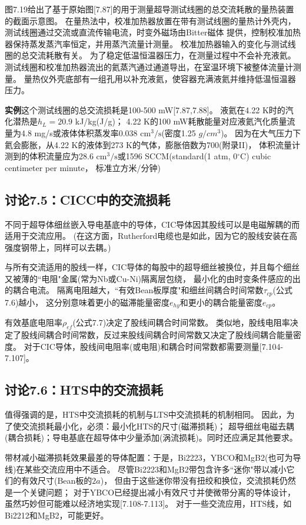 图7.19给出了基于原始图[7.87]的用于测量超导测试线圈的总交流耗散的量热装置的截面示意图。
在量热法中，校准加热器放置在带有测试线圈的量热计外壳内，测试线圈通过交流或直流传输电流，时变外磁场由Bitter磁体
提供，控制校准加热器保持蒸发蒸汽率恒定，并用蒸汽流量计测量。
校准加热器输入的变化与测试线圈的总交流耗散有关。
为了稳定低温恒温器压力，在测量过程中不会补充液氦。
测试线圈和校准加热器流出的氦蒸汽通过通道导出，在室温环境下被整体流量计测量。
量热仪外壳底部有一组孔用以补充液氦，使容器充满液氦并维持低温恒温器压力。

\textbf{实例}\quad 这个测试线圈的总交流损耗是100-500 mW[7.87,7.88]。
液氦在4.22 K时的汽化潜热是$h_L=20.9$ kJ/kg(J/g)；
4.22 K的100 mW耗散能量对应液氦汽化质量流量为4.8 mg/s或液体体积蒸发率0.038 $\mathrm{cm^3/s}$(密度1.25 $g/cm^3$)。
因为在大气压力下氦会膨胀，从4.22 K的液体到273 K的气体，膨胀倍数为700(附录II)，
体积流量计测到的体积流量应为28.6 $\mathrm{cm^3/s}$或1596 SCCM(standard(1 atm, 0$^\circ$C) cubic centimeter per minute， 标准立方米/分钟)

\subsection{讨论7.5：CICC中的交流损耗}
不同于超导体细丝嵌入导电基底中的导体，CIC导体因其股线可以是电磁解耦的而适用于交流应用。
(在这方面，Rutherford电缆也是如此，因为它的股线安装在高强度钢带上，同样可以去耦。)

与所有交流适用的股线一样，CIC导体的每股中的超导细丝被换位，并且每个细丝又被薄的``电阻"金属(常为Nb或Cu-Ni)隔离层包绕，
最小化的由时变条件感应的出的耦合电流。
隔离电阻越大，``有效Bean板厚度"和细丝间耦合时间常数$\tau_{cp}$(公式7.6)越小，
这分别意味着更小的磁滞能量密度$e_{hy}$和更小的耦合能量密度$e_{cp}$。

有效基底电阻率$\rho_{ef}$(公式7.7)决定了股线间耦合时间常数。
类似地，股线电阻率决定了股线间耦合时间常数，反过来股线间耦合时间常数又决定了股线间耦合能量密度。
对于CIC导体，股线间电阻率(或电阻)和耦合时间常数都需要测量[7.104-7.107]。

\subsection{讨论7.6：HTS中的交流损耗}
值得强调的是，HTS中交流损耗的机制与LTS中交流损耗的机制相同。
因此，为了使交流损耗最小化，必须：最小化HTS的尺寸(磁滞损耗)；
超导细丝电磁去耦(耦合损耗)；导电基底在超导体中少量添加(涡流损耗)。同时还应满足其他要求。

带材减小磁滞损耗效果最差的导体配置：于是，Bi2223，YBCO和MgB2(也可为导线)在某些交流应用中不适合。
尽管Bi2223和MgB2带包含许多``迷你"带以减小它们的有效尺寸(Bean板的$2a$)，
但由于这些迷你带没有扭绞和换位，交流损耗仍然是一个关键问题；
对于YBCO已经提出减小有效尺寸并使微带分离的导体设计，虽然巧妙但可能难以经济地实现[7.108-7.113]。
对于一些交流应用，HTS线，如Bi2212和MgB2，可能更好。


